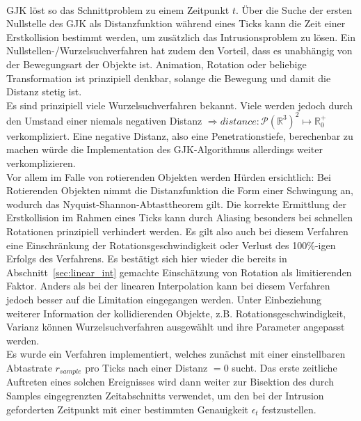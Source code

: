 ~\\
GJK löst so das Schnittproblem zu einem Zeitpunkt $t$. Über die Suche der ersten Nullstelle des GJK als Distanzfunktion während eines Ticks kann die Zeit einer Erstkollision bestimmt werden, um zusätzlich das Intrusionsproblem zu lösen.
Ein Nullstellen-/Wurzelsuchverfahren hat zudem den Vorteil, dass es unabhängig von der Bewegungsart der Objekte ist. Animation, Rotation oder beliebige Transformation ist prinzipiell denkbar, solange die Bewegung und damit die Distanz stetig ist.\\
Es sind prinzipiell viele Wurzelsuchverfahren bekannt. Viele werden jedoch durch den Umstand einer niemals negativen Distanz $\Rightarrow distance: \mathcal{P}(\mathbb{R}^3)^2 \mapsto \mathbb{R}^+_0$ verkompliziert. Eine negative Distanz, also eine Penetrationstiefe, berechenbar zu machen würde die Implementation des GJK-Algorithmus allerdings weiter verkomplizieren.\\


Vor allem im Falle von rotierenden Objekten werden Hürden ersichtlich:
Bei Rotierenden Objekten nimmt die Distanzfunktion die Form einer Schwingung an, wodurch das Nyquist-Shannon-Abtasttheorem gilt. Die korrekte Ermittlung der Erstkollision im Rahmen eines Ticks kann durch Aliasing besonders bei schnellen Rotationen prinzipiell verhindert werden. Es gilt also auch bei diesem Verfahren eine Einschränkung der Rotationsgeschwindigkeit oder Verlust des 100\%-igen Erfolgs des Verfahrens. Es bestätigt sich hier wieder die bereits in Abschnitt~\ref{sec:linear_int} gemachte Einschätzung von Rotation als limitierenden Faktor. Anders als bei der linearen Interpolation kann bei diesem Verfahren jedoch besser auf die Limitation eingegangen werden. Unter Einbeziehung weiterer Information der kollidierenden Objekte, z.B. Rotationsgeschwindigkeit, Varianz können Wurzelsuchverfahren ausgewählt und ihre Parameter angepasst werden.\\
Es wurde ein Verfahren implementiert, welches zunächst mit einer einstellbaren Abtastrate $r_{sample}$  pro Ticks nach einer Distanz $= 0$ sucht. Das erste zeitliche Auftreten eines solchen Ereignisses wird dann weiter zur Bisektion des durch Samples eingegrenzten Zeitabschnitts verwendet, um den bei der Intrusion geforderten Zeitpunkt mit einer bestimmten Genauigkeit $\epsilon_t$ festzustellen.\\


